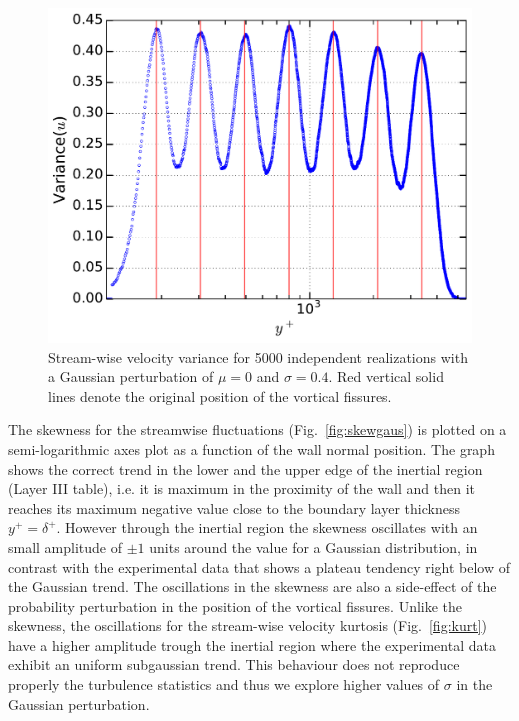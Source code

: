 \documentclass[aps,reprint,amsmath,amssymb,pra]{revtex4-1}%
\begin{document}
\begin{figure}[tb]
\includegraphics[scale=0.46]{figures/variance_5000_assembles}
\caption{\label{fig:varigaus} Stream-wise velocity variance for 5000 independent realizations with a Gaussian perturbation of $\mu=0$ and $\sigma=0.4$. Red vertical solid lines denote the original position of the
vortical fissures.}
\end{figure}
The skewness for the streamwise fluctuations (Fig.~\ref{fig:skewgaus})  is plotted on a semi-logarithmic axes plot as a function of the wall normal position. The graph shows the correct trend in the lower and the upper edge of the inertial region (Layer III table), i.e. it is maximum in the proximity of the wall and then it reaches its maximum negative value close to the boundary layer thickness $y^+=\delta^+$. However through the inertial region the skewness oscillates with an small amplitude of $\pm 1$ units around the value for a Gaussian distribution, in contrast with the experimental data that shows a plateau tendency right below of the Gaussian trend. The oscillations in the skewness are also a side-effect of the probability perturbation in the position of the vortical fissures. Unlike the skewness, the oscillations for the stream-wise velocity kurtosis (Fig.~\ref{fig:kurt}) have a higher amplitude trough the inertial region where the experimental data exhibit an uniform subgaussian trend. This behaviour does not reproduce properly the turbulence statistics and thus we explore higher values of $\sigma$ in the Gaussian perturbation.
\end{document}
